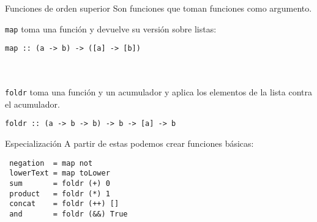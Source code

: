\begin{frame}[fragile]{Funciones de orden superior}
  Son funciones que toman funciones como argumento.

  \espacio

  \texttt{map} toma una función y devuelve su versión sobre listas:
  \begin{lstlisting}
map :: (a -> b) -> ([a] -> [b])
  \end{lstlisting}
  \\~\\
  \texttt{foldr} toma una función y un acumulador
  y aplica los elementos de la lista contra el acumulador.
  \begin{lstlisting}
foldr :: (a -> b -> b) -> b -> [a] -> b
  \end{lstlisting}

\end{frame}

\begin{frame}[fragile]{Especialización}
  A partir de estas podemos crear funciones básicas:

  \espacio

  \begin{lstlisting}
 negation  = map not
 lowerText = map toLower
 sum       = foldr (+) 0
 product   = foldr (*) 1
 concat    = foldr (++) []
 and       = foldr (&&) True
  \end{lstlisting}
  \espacio

\end{frame}
